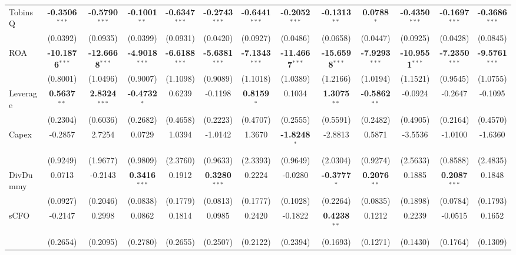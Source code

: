 \documentclass[11pt,a4paper]{article}
\begin{document}
\begin{table}[htbp]
\begin{tabular}{lcccccccccccc}
TobinsQ & \textbf{-0.3506}$^{***}$ & \textbf{-0.5790}$^{***}$ & \textbf{-0.1001}$^{**}$ & \textbf{-0.6347}$^{***}$ & \textbf{-0.2743}$^{***}$ & \textbf{-0.6441}$^{***}$ & \textbf{-0.2052}$^{***}$ & \textbf{-0.1313}$^{**}$ & \textbf{0.0788}$^{*}$ & \textbf{-0.4350}$^{***}$ & \textbf{-0.1697}$^{***}$ & \textbf{-0.3686}$^{***}$ \\
 & (0.0392) & (0.0935) & (0.0399) & (0.0931) & (0.0420) & (0.0927) & (0.0486) & (0.0658) & (0.0447) & (0.0925) & (0.0428) & (0.0845) \\
ROA & \textbf{-10.1876}$^{***}$ & \textbf{-12.6668}$^{***}$ & \textbf{-4.9018}$^{***}$ & \textbf{-6.6188}$^{***}$ & \textbf{-5.6381}$^{***}$ & \textbf{-7.1343}$^{***}$ & \textbf{-11.4667}$^{***}$ & \textbf{-15.6598}$^{***}$ & \textbf{-7.9293}$^{***}$ & \textbf{-10.9551}$^{***}$ & \textbf{-7.2350}$^{***}$ & \textbf{-9.5761}$^{***}$ \\
 & (0.8001) & (1.0496) & (0.9007) & (1.1098) & (0.9089) & (1.1018) & (1.0389) & (1.2166) & (1.0194) & (1.1521) & (0.9545) & (1.0755) \\
Leverage & \textbf{0.5637}$^{**}$ & \textbf{2.8324}$^{***}$ & \textbf{-0.4732}$^{*}$ & 0.6239 & -0.1198 & \textbf{0.8159}$^{*}$ & 0.1034 & \textbf{1.3075}$^{**}$ & \textbf{-0.5862}$^{**}$ & -0.0924 & -0.2647 & -0.1095 \\
 & (0.2304) & (0.6036) & (0.2682) & (0.4658) & (0.2223) & (0.4707) & (0.2555) & (0.5591) & (0.2482) & (0.4905) & (0.2164) & (0.4570) \\
Capex & -0.2857 & 2.7254 & 0.0729 & 1.0394 & -1.0142 & 1.3670 & \textbf{-1.8248}$^{*}$ & -2.8813 & 0.5871 & -3.5536 & -1.0100 & -1.6360 \\
 & (0.9249) & (1.9677) & (0.9809) & (2.3760) & (0.9633) & (2.3393) & (0.9649) & (2.0304) & (0.9274) & (2.5633) & (0.8588) & (2.4835) \\
DivDummy & 0.0713 & -0.2143 & \textbf{0.3416}$^{***}$ & 0.1912 & \textbf{0.3280}$^{***}$ & 0.2224 & -0.0280 & \textbf{-0.3777}$^{*}$ & \textbf{0.2076}$^{**}$ & 0.1885 & \textbf{0.2087}$^{***}$ & 0.1848 \\
 & (0.0927) & (0.2046) & (0.0838) & (0.1779) & (0.0813) & (0.1777) & (0.1028) & (0.2264) & (0.0835) & (0.1898) & (0.0784) & (0.1793) \\
sCFO & -0.2147 & 0.2998 & 0.0862 & 0.1814 & 0.0985 & 0.2420 & -0.1822 & \textbf{0.4238}$^{**}$ & 0.1212 & 0.2239 & -0.0515 & 0.1652 \\
 & (0.2654) & (0.2095) & (0.2780) & (0.2655) & (0.2507) & (0.2122) & (0.2394) & (0.1693) & (0.1271) & (0.1430) & (0.1764) & (0.1309) \\

\end{tabular}
\end{table}
\end{document}
